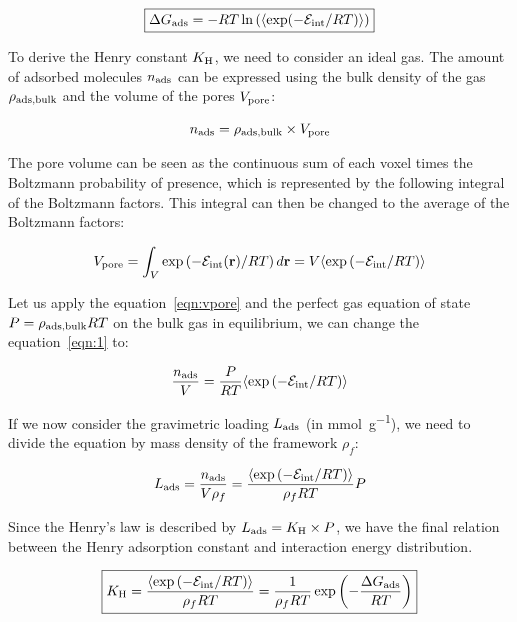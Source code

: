 \documentclass[main.tex]{subfiles}
\begin{document}
\begin{equation}\label{eq:ads_gibbs}
  \boxed{
  \Delta G_{\text{ads}} = -RT \ln\left(\langle \exp(-\mathcal{E}_{\text{int}}/RT) \rangle\right)
  }
\end{equation}

To derive the Henry constant $K_{\text{H}}$, we need to consider an ideal gas. The amount of adsorbed molecules $n_{\text{ads}}$ can be expressed using the bulk density of the gas $\rho_{\text{ads,bulk}}$ and the volume of the pores $V_{\text{pore}}$:

\begin{equation}\label{eqn:1}
    n_{\text{ads}} = \rho_{\text{ads,bulk}} \times V_{\text{pore}}  
\end{equation}

The pore volume can be seen as the continuous sum of each voxel times the Boltzmann probability of presence, which is represented by the following integral of the Boltzmann factors. This integral can then be changed to the average of the Boltzmann factors:

\begin{equation}\label{eqn:vpore}
    V_{\text{pore}} = \int_V \exp\left(- \mathcal{E}_{\text{int}}(\textbf{r})/RT\right) d\textbf{r} = V \langle \exp\left(-\mathcal{E}_{\text{int}}/RT\right) \rangle
\end{equation}

Let us apply the equation~\ref{eqn:vpore} and the perfect gas equation of state $P = \rho_{\text{ads,bulk}}RT$ on the bulk gas in equilibrium, we can change the equation~\ref{eqn:1} to:

\begin{equation}
    \dfrac{n_{\text{ads}}}{V} = \dfrac{P}{RT} \langle \exp\left(-\mathcal{E}_{\text{int}}/RT\right) \rangle
\end{equation}

If we now consider the gravimetric loading $L_{\text{ads}}$ (in \si{\milli\mole\per\gram}), we need to divide the equation by mass density of the framework $\rho_f$:

\begin{equation}
  L_{\text{ads}} = \dfrac{n_{\text{ads}}}{V\rho_f} = \dfrac{\langle \exp\left(-\mathcal{E}_{\text{int}}/RT\right) \rangle}{\rho_fRT} P
\end{equation}

Since the Henry's law is described by $L_{\text{ads}}=K_{\text{H}} \times P$, we have the final relation between the Henry adsorption constant and interaction energy distribution.

\begin{equation}\label{eqn:henry}
    \boxed{
    K_{\text{H}} = \dfrac{\langle \exp\left(-\mathcal{E}_{\text{int}}/RT\right) \rangle}{\rho_fRT} = \dfrac{1}{\rho_fRT} \exp\left(-\dfrac{\Delta G_{\text{ads}}}{RT}\right)
    }
\end{equation}
\end{document}
